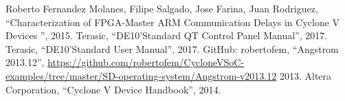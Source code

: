 \documentclass[conference]{IEEEtran}
\begin{document}
\begin{thebibliography}{00}
 Roberto Fernandez Molanes, Filipe Salgado, Jose Farina, Juan Rodriguez, ``Characterization of FPGA-Master ARM Communication Delays in Cyclone V Devices '', 2015.
 Terasic, ``DE10'Standard QT Control Panel Manual'', 2017.
 Terasic, ``DE10'Standard User Manual'', 2017.
 GitHub: robertofem, ``Angstrom 2013.12'', \url{https://github.com/robertofem/CycloneVSoC-examples/tree/master/SD-operating-system/Angstrom-v2013.12}
 2013.
 Altera Corporation, ``Cyclone V Device Handbook'', 2014.
\end{thebibliography}
\end{document}
